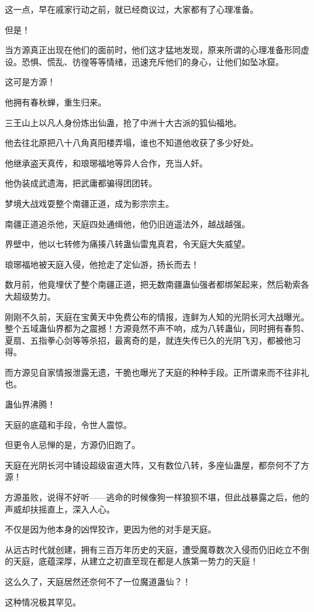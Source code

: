 \begin{this_body}
这一点，早在戚家行动之前，就已经商议过，大家都有了心理准备。

但是！

当方源真正出现在他们的面前时，他们这才猛地发现，原来所谓的心理准备形同虚设。恐惧、慌乱、彷徨等等情绪，迅速充斥他们的身心，让他们如坠冰窟。

这可是方源！

他拥有春秋蝉，重生归来。

三王山上以凡人身份炼出仙蛊，抢了中洲十大古派的狐仙福地。

他去往北原把八十八角真阳楼弄塌，谁也不知道他收获了多少好处。

他继承盗天真传，和琅琊福地等异人合作，充当人奸。

他伪装成武遗海，把武庸都骗得团团转。

梦境大战戏耍整个南疆正道，成为影宗宗主。

南疆正道追杀他，天庭四处通缉他，他仍旧逍遥法外，越战越强。

界壁中，他以七转修为痛揍八转蛊仙雷鬼真君，令天庭大失威望。

琅琊福地被天庭入侵，他抢走了定仙游，扬长而去！

数月前，他竟埋伏了整个南疆正道，把无数南疆蛊仙强者都绑架起来，然后勒索各大超级势力。

刚刚不久前，天庭在宝黄天中免费公布的情报，连鲜为人知的光阴长河大战曝光。整个五域蛊仙界都为之震撼！方源竟然不声不响，成为八转蛊仙，同时拥有春剪、夏扇、五指拳心剑等等杀招，最离奇的是，就连失传已久的光阴飞刃，都被他习得。

而方源见自家情报泄露无遗，干脆也曝光了天庭的种种手段。正所谓来而不往非礼也。

蛊仙界沸腾！

天庭的底蕴和手段，令世人震惊。

但更令人忌惮的是，方源仍旧跑了。

天庭在光阴长河中铺设超级宙道大阵，又有数位八转，多座仙蛊屋，都奈何不了方源！

方源虽败，说得不好听——逃命的时候像狗一样狼狈不堪，但此战暴露之后，他的声威却扶摇直上，深入人心。

不仅是因为他本身的凶悍狡诈，更因为他的对手是天庭。

从远古时代就创建，拥有三百万年历史的天庭，遭受魔尊数次入侵而仍旧屹立不倒的天庭，底蕴深厚，从建立之初直至现在都是人族第一势力的天庭！

这么久了，天庭居然还奈何不了一位魔道蛊仙？！

这种情况极其罕见。


\end{this_body}
